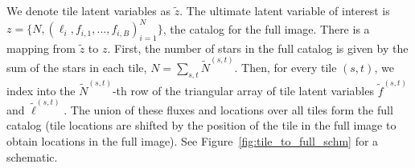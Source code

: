 We denote tile latent variables as $\tilde z$.
The ultimate latent variable of interest is $z = \{N, (\ell_i, f_{i,1}, ..., f_{i,B})_{i = 1}^N\}$, the catalog for the full image.
There is a mapping from $\tilde z$ to $z$.
First, the number of stars in the full catalog is given by the sum of the stars in each tile, $N = \sum_{s,t} \tilde N^{(s, t)}$.
Then, for every tile $(s,t)$, we index into the $\tilde N^{(s,t)}$-th row of the triangular array of tile latent variables $\tilde f^{(s,t)}$ and $\tilde \ell^{(s,t)}$.
The union of these fluxes and locations over all tiles form the full catalog (tile locations are shifted by the position of the tile in the full image to obtain locations in the full image).
See Figure~\ref{fig:tile_to_full_schm} for a schematic.





